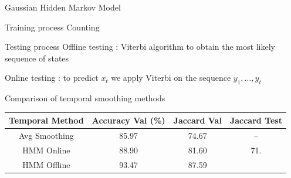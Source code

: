 \begin{frame}{Gaussian Hidden Markov Model}
	
	\begin{block}{Training process}
	Counting
	\end{block}
	
	\begin{block}{Testing process}
	Offline testing : Viterbi algorithm to obtain the most likely sequence of states
	
	Online testing : to predict $x_t$ we apply Viterbi on the sequence $y_1,...,y_t$
	\end{block}

\end{frame}
	

\begin{frame}{Comparison of temporal smoothing methods}

	\begin{table}
	\begin{center}
		\begin{tabular}{|c|c|c|c|}
			\hline
			Temporal Method & Accuracy Val (\%) & Jaccard Val & Jaccard Test \\
			\hline\hline
			Avg Smoothing & 85.97 & 74.67 & -- \\
			HMM Online & 88.90 & 81.60 & 71.\\
			HMM Offline & 93.47 & 87.59 & \\
			\hline
		\end{tabular}
	\end{center}
	\end{table}

\end{frame}

